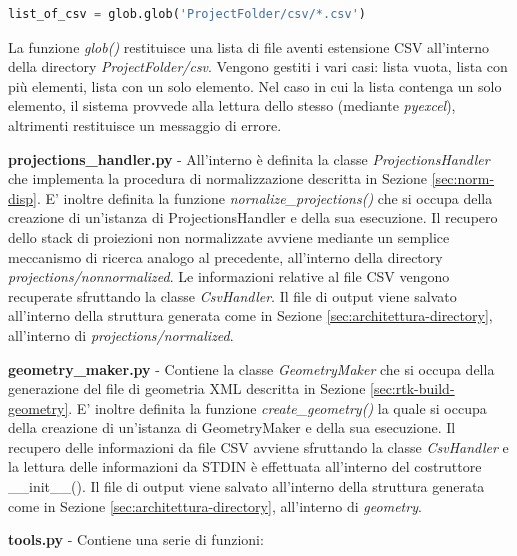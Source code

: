 \documentclass[a4paper,12pt, doubleside]{report}
\begin{document}
                \begin{lstlisting}[language=python, frame=bt]
list_of_csv = glob.glob('ProjectFolder/csv/*.csv')
                \end{lstlisting}
                
                La funzione \textit{glob()} restituisce una lista di file aventi estensione CSV all'interno della directory \textit{ProjectFolder/csv}. Vengono gestiti i vari casi: lista vuota, lista con più elementi, lista con un solo elemento. Nel caso in cui la lista contenga un solo elemento, il sistema provvede alla lettura dello stesso (mediante \textit{pyexcel}), altrimenti restituisce un messaggio di errore.
                
            \bigskip
            \par
                \textbf{projections\_handler.py} - All'interno è definita la classe \textit{ProjectionsHandler} che implementa la procedura di normalizzazione descritta in Sezione \ref{sec:norm-disp}. E' inoltre definita la funzione \textit{nornalize\_projections()} che si occupa della creazione di un'istanza di ProjectionsHandler e della sua esecuzione. Il recupero dello stack di proiezioni non normalizzate avviene mediante un semplice meccanismo di ricerca analogo al precedente, all'interno della directory \textit{projections/non\textunderscore normalized}. Le informazioni relative al file CSV vengono recuperate sfruttando la classe \textit{CsvHandler}. Il file di output viene salvato all'interno della struttura generata come in Sezione \ref{sec:architettura-directory}, all'interno di \textit{projections/normalized}.
                
            \bigskip
            \par
               \textbf{geometry\_maker.py} - Contiene la classe \textit{GeometryMaker} che si occupa della generazione del file di geometria XML descritta in Sezione \ref{sec:rtk-build-geometry}. E' inoltre definita la funzione \textit{create\_geometry()} la quale si occupa della creazione di un'istanza di GeometryMaker e della sua esecuzione. Il recupero delle informazioni da file CSV avviene sfruttando la classe \textit{CsvHandler} e la lettura delle informazioni da STDIN è effettuata all'interno del costruttore \_\_init\_\_(). Il file di output viene salvato all'interno della struttura generata come in Sezione \ref{sec:architettura-directory}, all'interno di \textit{geometry}.
            
            \bigskip
            \par
                \textbf{tools.py} - Contiene una serie di funzioni:
                
\end{document}
